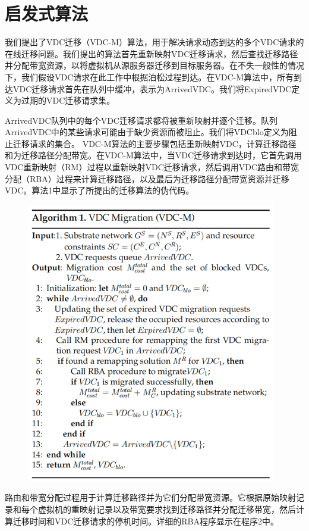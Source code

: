 \chapter{启发式算法}
我们提出了VDC迁移（VDC-M）算法，用于解决请求动态到达的多个VDC请求的在线迁移问题。我们提出的算法首先重新映射VDC迁移请求，然后查找迁移路径并分配带宽资源，以将虚拟机从源服务器迁移到目标服务器。在不失一般性的情况下，我们假设VDC请求在此工作中根据泊松过程到达。在VDC-M算法中，所有到达VDC迁移请求首先在队列中缓冲，表示为ArrivedVDC。我们将ExpiredVDC定义为过期的VDC迁移请求集。 

ArrivedVDC队列中的每个VDC迁移请求都将被重新映射并逐个迁移。队列ArrivedVDC中的某些请求可能由于缺少资源而被阻止。我们将VDCblo定义为阻止迁移请求的集合。
VDC-M算法的主要步骤包括重新映射VDC，计算迁移路径和为迁移路径分配带宽。在VDC-M算法中，当VDC迁移请求到达时，它首先调用VDC重新映射（RM）过程以重新映射VDC迁移请求，然后调用VDC路由和带宽分配（RBA）过程来计算迁移路径，以及最后为迁移路径分配带宽资源并迁移VDC。算法1中显示了所提出的迁移算法的伪代码。

\begin{figure}[!htb]
  \centering
  \includegraphics{./Figure/Other1.png}
\end{figure}

路由和带宽分配过程用于计算迁移路径并为它们分配带宽资源。它根据原始映射记录和每个虚拟机的重映射记录以及带宽要求找到迁移路径并分配迁移带宽，然后计算迁移时间和VDC迁移请求的停机时间。详细的RBA程序显示在程序2中。

